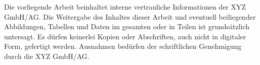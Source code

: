 Die vorliegende Arbeit beinhaltet interne vertrauliche Informationen der XYZ GmbH/AG. Die Weitergabe des Inhaltes dieser Arbeit und eventuell beiliegender Abbildungen, Tabellen und Daten im gesamten oder in Teilen ist grundsätzlich untersagt. Es dürfen keinerlei Kopien oder Abschriften, auch nicht in digitaler Form, gefertigt werden. Ausnahmen bedürfen der schriftlichen Genehmigung durch die XYZ GmbH/AG.
\newpage